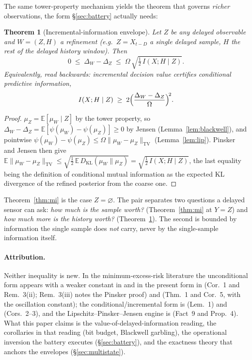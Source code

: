 \documentclass[11pt]{article}
\newtheorem{theorem}{Theorem}
\newcommand{\TV}{\mathrm{TV}}
\newcommand{\KL}{D_{\mathrm{KL}}}
\newcommand{\E}{\mathbb{E}}
\begin{document}
The same tower-property mechanism yields the theorem that governs
\emph{richer} observations, the form \S\ref{sec:battery} actually needs:

\begin{theorem}[Incremental-information envelope]\label{thm:incr}
Let $Z$ be any delayed observable and $W=(Z,H)$ a refinement (e.g.\
$Z=X_{t-D}$ a single delayed sample, $H$ the rest of the delayed history
window). Then
\[
0\;\le\;\Delta_W-\Delta_Z\;\le\;\Omega\,
\sqrt{\tfrac12\,I(X;H\mid Z)} .
\]
Equivalently, read backwards:
\emph{incremental decision value certifies conditional predictive
information},
\[
I(X;H\mid Z)\;\ge\;2\Bigl(\frac{\Delta_W-\Delta_Z}{\Omega}\Bigr)^{\!2}.
\]
\end{theorem}

\begin{proof}
$\mu_Z=\E[\mu_W\mid Z]$ by the tower property, so
$\Delta_W-\Delta_Z=\E[\psi(\mu_W)-\psi(\mu_Z)]\ge0$ by Jensen
(Lemma~\ref{lem:blackwell}), and pointwise
$\psi(\mu_W)-\psi(\mu_Z)\le\Omega\|\mu_W-\mu_Z\|_{\TV}$
(Lemma~\ref{lem:lip}). Pinsker and Jensen then give
$\E\|\mu_W-\mu_Z\|_{\TV}
\le\sqrt{\tfrac12\,\E\,\KL(\mu_W\|\mu_Z)}
=\sqrt{\tfrac12\,I(X;H\mid Z)}$,
the last equality being the definition of conditional mutual information as
the expected KL divergence of the refined posterior from the coarse one.
\end{proof}

Theorem~\ref{thm:mi} is the case $Z=\varnothing$. The pair separates two
questions a delayed sensor can ask: \emph{how much is the sample worth?}
(Theorem~\ref{thm:mi} at $Y=Z$) and \emph{how much more is the history
worth?} (Theorem~\ref{thm:incr}). The second is bounded by
information the single sample does \emph{not} carry, never by the
single-sample information itself.

\paragraph{Attribution.} Neither inequality is new. In the
minimum-excess-risk literature the unconditional form appears with a
weaker constant in \cite{makhdoumi14} and in the present form in
\cite{gyorfi23} (Cor.~1 and Rem.~3(ii); Rem.~3(iii) notes the Pinsker
proof) and \cite{xu20} (Thm.~1 and Cor.~5, with the oscillation constant); the
conditional/incremental form is \cite{hafezkolahi21} (Lem.~1) and
\cite{xuraginsky22} (Cors.~2--3), and the Lipschitz--Pinsker--Jensen
engine is \cite{russo16} (Fact~9 and Prop.~4). What this paper claims is
the value-of-delayed-information reading, the corollaries in that reading
(bit budget, Blackwell garbling), the operational inversion the battery
executes (\S\ref{sec:battery}), and the exactness theory that anchors
the envelopes (\S\ref{sec:multistate}).
\end{document}
